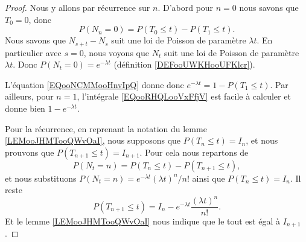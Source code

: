 \begin{proof}
	Nous y allons par récurrence sur \( n\). D'abord pour \( n=0\) nous savons que \( T_0=0\), donc
	\begin{equation}        \label{EQooNCMMooHnvIpQ}
		P(N_n=0)=P(T_0\leq t)-P(T_1\leq t).
	\end{equation}
	Nous savons que \( N_{s+t}-N_s\) suit une loi de Poisson de paramètre \( \lambda t\). En particulier avec \( s=0\), nous voyons que \( N_t\) suit une loi de Poisson de paramètre \( \lambda t\). Donc \( P(N_t=0)= e^{-\lambda t}\) (définition \ref{DEFooUWKHooUFKlcr}).

	L'équation \ref{EQooNCMMooHnvIpQ} donne donc \(  e^{-\lambda t}=1-P(T_1\leq t)\). Par ailleurs, pour \( n=1\), l'intégrale \eqref{EQooRHQLooVxFfjV} est facile à calculer et donne bien \( 1- e^{-\lambda t}\).

	Pour la récurrence, en reprenant la notation du lemme \ref{LEMooJHMTooQWvOaI}, nous supposons que \( P(T_n\leq t)=I_n\), et nous prouvons que \( P(T_{n+1}\leq t)=I_{n+1}\). Pour cela nous repartons de
	\begin{equation}
		P(N_t=n)=P(T_n\leq t)-P(T_{n+1}\leq t),
	\end{equation}
	et nous substituons \( P(N_t=n)= e^{-\lambda t}(\lambda t)^n/n!\) ainsi que \( P(T_n\leq t)=I_n\). Il reste
	\begin{equation}
		P(T_{n+1}\leq t)=I_n- e^{-\lambda t}\frac{ (\lambda t)^n }{ n! }.
	\end{equation}
	Et le lemme \ref{LEMooJHMTooQWvOaI} nous indique que le tout est égal à \( I_{n+1}\).
\end{proof}

